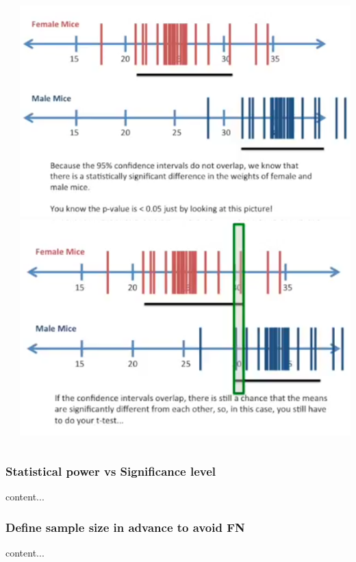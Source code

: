 \documentclass{beamer}
\begin{document}
\begin{frame}
\begin{columns}
\begin{column}{0.33\textwidth}
		\end{column}
		\begin{column}{0.33\textwidth}
			\includegraphics[scale=0.2]{figs/conf5}\\
			\includegraphics[scale=0.2]{figs/conf6}
		\end{column}
	\end{columns}
	
\end{frame}

\begin{frame}\frametitle{Statistical power vs Significance level}
content...
\end{frame}

\begin{frame}\frametitle{Define sample size in advance to avoid FN}
	content...
\end{frame}
\end{document}
